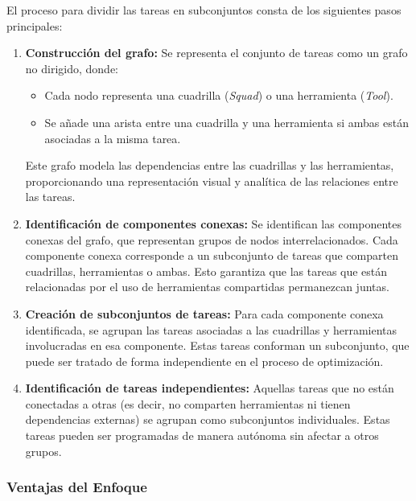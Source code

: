 \documentclass{article}
\begin{document}
El proceso para dividir las tareas en subconjuntos consta de los siguientes pasos principales:

\begin{enumerate}
    \item \textbf{Construcción del grafo:}  
    Se representa el conjunto de tareas como un grafo no dirigido, donde:
    \begin{itemize}
        \item Cada nodo representa una cuadrilla (\textit{Squad}) o una herramienta (\textit{Tool}).
        \item Se añade una arista entre una cuadrilla y una herramienta si ambas están asociadas a la misma tarea.
    \end{itemize}
    Este grafo modela las dependencias entre las cuadrillas y las herramientas, proporcionando una representación visual y analítica de las relaciones entre las tareas.
    
    \item \textbf{Identificación de componentes conexas:}  
    Se identifican las componentes conexas del grafo, que representan grupos de nodos interrelacionados. Cada componente conexa corresponde a un subconjunto de tareas que comparten cuadrillas, herramientas o ambas. Esto garantiza que las tareas que están relacionadas por el uso de herramientas compartidas permanezcan juntas.
    
    \item \textbf{Creación de subconjuntos de tareas:}  
    Para cada componente conexa identificada, se agrupan las tareas asociadas a las cuadrillas y herramientas involucradas en esa componente. Estas tareas conforman un subconjunto, que puede ser tratado de forma independiente en el proceso de optimización.
    
    \item \textbf{Identificación de tareas independientes:}  
    Aquellas tareas que no están conectadas a otras (es decir, no comparten herramientas ni tienen dependencias externas) se agrupan como subconjuntos individuales. Estas tareas pueden ser programadas de manera autónoma sin afectar a otros grupos.
\end{enumerate}

\subsubsection{Ventajas del Enfoque}
\end{document}
